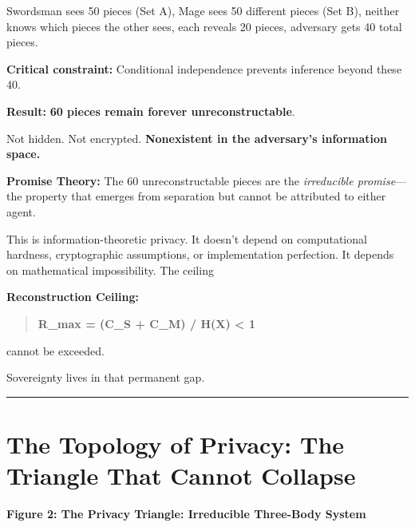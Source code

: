 \documentclass[
]{article}
\begin{document}
Swordsman sees 50 pieces (Set A), Mage sees 50 different pieces (Set B),
neither knows which pieces the other sees, each reveals 20 pieces,
adversary gets 40 total pieces.

\textbf{Critical constraint:} Conditional independence prevents
inference beyond these 40.

\textbf{Result:} \textbf{60 pieces remain forever unreconstructable}.

Not hidden. Not encrypted. \textbf{Nonexistent in the adversary's
information space.}

\textbf{Promise Theory:} The 60 unreconstructable pieces are the
\emph{irreducible promise}---the property that emerges from separation
but cannot be attributed to either agent.

This is information-theoretic privacy. It doesn't depend on
computational hardness, cryptographic assumptions, or implementation
perfection. It depends on mathematical impossibility. The ceiling

\textbf{Reconstruction Ceiling:}

\begin{quote}
\textbf{R\_max = (C\_S + C\_M) / H(X) \textless{} 1}
\end{quote}

cannot be exceeded.

Sovereignty lives in that permanent gap.

\begin{center}\rule{0.5\linewidth}{0.5pt}\end{center}

\section{The Topology of Privacy: The Triangle That Cannot
Collapse}\label{the-topology-of-privacy-the-triangle-that-cannot-collapse}

\textbf{Figure 2: The Privacy Triangle: Irreducible Three-Body System}
\end{document}
